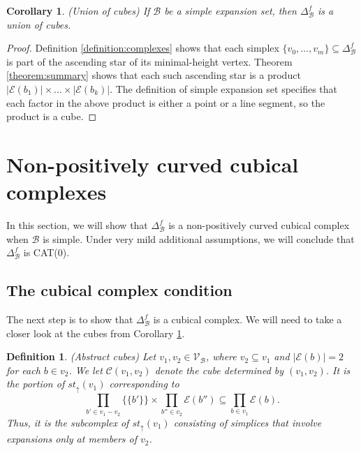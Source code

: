 \documentclass{amsart}
\newtheorem{Definition}[theorem]{Definition}
\newtheorem{corollary}[theorem]{Corollary}
\newtheorem{standing assumption}[theorem]{Standing Assumption}
\newenvironment{definition}{\begin{Definition}\normalfont}{\end{Definition}}
\begin{document}
\begin{corollary} \label{corollary:unionofcubes}
(Union of cubes)
If $\mathcal{B}$ be a simple expansion set, then 
$\Delta^{f}_{\mathcal{B}}$ is a union of cubes. 
\end{corollary}

\begin{proof}
Definition \ref{definition:complexes} shows that each simplex
$\{ v_{0}, \ldots, v_{m} \} \subseteq \Delta^{f}_{\mathcal{B}}$ is part of the ascending star of its minimal-height vertex. Theorem \ref{theorem:summary} shows that each such ascending star is a product $|\mathcal{E}(b_{1})| \times \ldots
\times |\mathcal{E}(b_{k})|$. The definition of simple expansion set
specifies that each factor in the above product is either a point or a line segment, so the product is a cube.
\end{proof}




\section{Non-positively curved cubical complexes}

In this section, we will show that $\Delta^{f}_{\mathcal{B}}$ is a non-positively curved cubical complex when $\mathcal{B}$ is simple. Under very mild additional assumptions, we will conclude that $\Delta^{f}_{\mathcal{B}}$ is CAT(0). 

\subsection{The cubical complex condition}

The next step is to show that $\Delta^{f}_{\mathcal{B}}$ is a cubical complex.
We will need to take a closer look at the cubes from Corollary \ref{corollary:unionofcubes}.

\begin{definition} \label{definition:cubes} (Abstract cubes)
Let $v_{1}, v_{2} \in \mathcal{V}_{\mathcal{B}}$, where $v_{2} \subseteq v_{1}$
and $|\mathcal{E}(b)| = 2$ for each $b \in v_{2}$. We let $\mathcal{C}(v_{1},v_{2})$ denote the \emph{cube determined by $(v_{1},v_{2})$}.  It is the portion of 
$st_{\uparrow}(v_{1})$ corresponding to 
\[ \prod_{b' \in v_{1}-v_{2}} \{ \{ b' \} \} \times \prod_{b'' \in v_{2}} \mathcal{E}(b'')
\subseteq \prod_{b \in v_{1}} \mathcal{E}(b). \]
Thus, it is the subcomplex of $st_{\uparrow}(v_{1})$ consisting of simplices that involve expansions only at members of $v_{2}$.
\end{definition}
\end{document}
